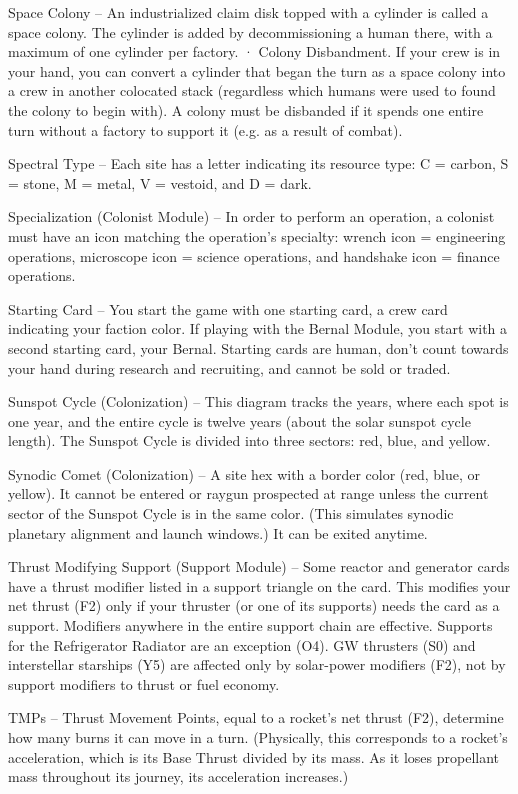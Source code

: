 \documentclass[a4paper]{book}
\begin{document}
Space Colony – An industrialized claim disk topped with a cylinder is called a space colony. The cylinder is added by decommissioning a human there, with a maximum of one cylinder per factory.
·   	Colony Disbandment. If your crew is in your hand, you can convert a cylinder that began the turn as a space colony into a crew in another colocated stack (regardless which humans were used to found the colony to begin with). A colony must be disbanded if it spends one entire turn without a factory to support it (e.g. as a result of combat).

Spectral Type – Each site has a letter indicating its resource type: C = carbon, S = stone, M = metal, V = vestoid, and D = dark.

Specialization (Colonist Module) – In order to perform an operation, a colonist must have an icon matching the operation’s specialty: wrench icon = engineering operations, microscope icon = science operations, and handshake icon = finance operations.

Starting Card – You start the game with one starting card, a crew card indicating your faction color. If playing with the Bernal Module, you start with a second starting card, your Bernal. Starting cards are human, don’t count towards your hand during research and recruiting, and cannot be sold or traded.

Sunspot Cycle (Colonization) – This diagram tracks the years, where each spot is one year, and the entire cycle is twelve years (about the solar sunspot cycle length). The Sunspot Cycle is divided into three sectors: red, blue, and yellow.

Synodic Comet (Colonization) – A site hex with a border color (red, blue, or yellow). It cannot be entered or raygun prospected at range unless the current sector of the Sunspot Cycle is in the same color. (This simulates synodic planetary alignment and launch windows.) It can be exited anytime.

Thrust Modifying Support (Support Module) – Some reactor and generator cards have a thrust modifier listed in a support triangle on the card. This modifies your net thrust (F2) only if your thruster (or one of its supports) needs the card as a support. Modifiers anywhere in the entire support chain are effective. Supports for the Refrigerator Radiator are an exception (O4). GW thrusters (S0) and interstellar starships (Y5) are affected only by solar-power modifiers (F2), not by support modifiers to thrust or fuel economy.

TMPs – Thrust Movement Points, equal to a rocket’s net thrust (F2), determine how many burns it can move in a turn. (Physically, this corresponds to a rocket’s acceleration, which is its Base Thrust divided by its mass. As it loses propellant mass throughout its journey, its acceleration increases.)
\end{document}
